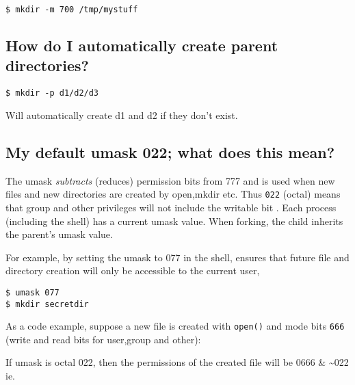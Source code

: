 \begin{verbatim}
$ mkdir -m 700 /tmp/mystuff
\end{verbatim}

\subsection{How do I automatically create parent
directories?}\label{how-do-i-automatically-create-parent-directories}

\begin{verbatim}
$ mkdir -p d1/d2/d3
\end{verbatim}

Will automatically create d1 and d2 if they don't exist.

\subsection{My default umask 022; what does this
mean?}\label{my-default-umask-022-what-does-this-mean}

The umask \emph{subtracts} (reduces) permission bits from 777 and is
used when new files and new directories are created by open,mkdir etc.
Thus \texttt{022} (octal) means that group and other privileges will not
include the writable bit . Each process (including the shell) has a
current umask value. When forking, the child inherits the parent's umask
value.

For example, by setting the umask to 077 in the shell, ensures that
future file and directory creation will only be accessible to the
current user,

\begin{verbatim}
$ umask 077
$ mkdir secretdir
\end{verbatim}

As a code example, suppose a new file is created with \texttt{open()}
and mode bits \texttt{666} (write and read bits for user,group and
other):

\begin{Shaded}
\begin{Highlighting}[]
\end{Highlighting}
\end{Shaded}

If umask is octal 022, then the permissions of the created file will be
0666 \& \textasciitilde{}022 ie.

\begin{Shaded}
\begin{Highlighting}[]
\end{Highlighting}
\end{Shaded}

